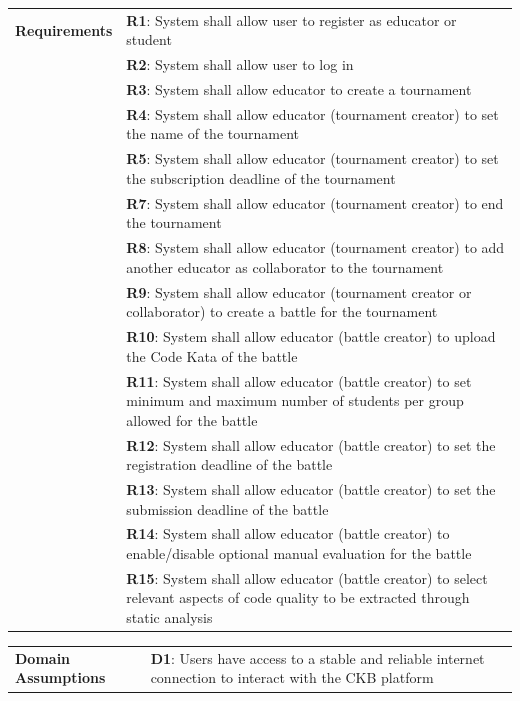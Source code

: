 \begin{center}
    \begin{tabular}{ |m{3cm}|m{10cm}| }
        \hline
        \textbf{Requirements} 
        & \textbf{R1}: System shall allow user to register as educator or student \\
        & \textbf{R2}: System shall allow user to log in \\
        & \textbf{R3}: System shall allow educator to create a tournament \\
        & \textbf{R4}: System shall allow educator (tournament creator) to set the name of the tournament \\
        & \textbf{R5}: System shall allow educator (tournament creator) to set the subscription deadline of the tournament \\
        & \textbf{R7}: System shall allow educator (tournament creator) to end the tournament \\
        & \textbf{R8}: System shall allow educator (tournament creator) to add another educator as collaborator to the tournament \\
        & \textbf{R9}: System shall allow educator (tournament creator or collaborator) to create a battle for the tournament \\
        & \textbf{R10}: System shall allow educator (battle creator) to upload the Code Kata of the battle \\
        & \textbf{R11}: System shall allow educator (battle creator) to set minimum and maximum number of students per group allowed for the battle \\
        & \textbf{R12}: System shall allow educator (battle creator) to set the registration deadline of the battle \\
        & \textbf{R13}: System shall allow educator (battle creator) to set the submission deadline of the battle \\
        & \textbf{R14}: System shall allow educator (battle creator) to enable/disable optional manual evaluation for the battle \\
        & \textbf{R15}: System shall allow educator (battle creator) to select relevant aspects of code quality to be extracted through static analysis \\
        \hline
    \end{tabular}
    \begin{tabular}{ |m{3cm}|m{10cm}| }
        \hline
        \textbf{Domain \newline Assumptions} 
        & \textbf{D1}: Users have access to a stable and reliable internet connection to interact with the CKB platform \\

\end{tabular}
\end{center}
